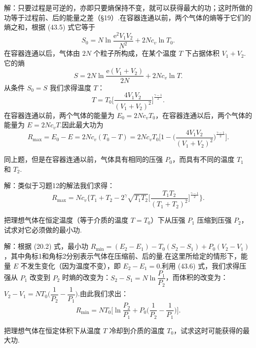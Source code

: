 \begin{xiti}
解：只要过程是可逆的，亦即只要熵保持不变，就可以获得最大的功；这时所做的功等于过程前、后的能量之差（§19）.在容器连通以前，两个气体的熵等于它们的熵之和，根据 (43.5) 式它等于
\begin{equation*}
  S_0=N\ln\frac{\mathrm{e}^2V_1V_2}{N^2}+2Nc_v\ln T_0.
\end{equation*}
在容器连通以后，气体由 $2N$ 个粒子所构成，在某个温度 $T$ 下占据体积 $V_1+V_2$.它的熵
\begin{equation*}
  S=2N\ln\frac{\mathrm{e}\left(V_1+V_2\right)}{2N}+2Nc_v\ln T.
\end{equation*}
从条件 $S_0=S$ 我们求得温度 $T$：
\begin{equation*}
  T=T_0\Big[\frac{4V_1V_2}{\left(V_1+V_2\right)^2}\Big]^{\frac{\gamma-1}{2}}.
\end{equation*}
在容器连通以前，两个气体的能量为 $E_0=2Nc_vT_0$，在容器连通以后，两个气体的能量为 $E=2Nc_vT$.因此最大功为
\begin{equation*}
  R_{\mathrm{max}}=E_0-E=2Nc_v(T_0-T)
  =2Nc_vT_0\Bigg[1-\bigg(\frac{4V_1V_2}{(V_1+V_2)^2}\bigg)^{\frac{\gamma-1}{2}}\Bigg].
\end{equation*}

\quad 同上题，但是在容器连通以前，气体具有相同的压强 $P_0$，而具有不同的温度 $T_1$ 和 $T_2$.

解：类似于习题12的解法我们求得：
\begin{equation*}
  R_{\mathrm{max}}=Nc_v\Bigg\{T_1+T_2
  -2^{\gamma}\sqrt{T_1T_2}
  \Bigg[\frac{T_1T_2}{\left(T_1+T_2\right)^2}\Bigg]^{\frac{\gamma-1}{2}}\Bigg\}.
\end{equation*}

\quad 把理想气体在恒定温度（等于介质的温度 $T=T_0$）下从压强 $P_1$ 压缩到压强 $P_2$，试求对它必须做的最小功.

解：根据 (20.2) 式，最小功 $R_{\mathrm{min}}=(E_2-E_1)-T_0(S_2-S_1)+P_0(V_2-V_1)$，其中角标1和角标2分别表示气体在压缩前、后的量.在这里所给定的情形下，能量 $E$ 不发生变化（因为温度不变），即 $E_2-E_1=0$.利用 (43.6) 式，我们求得压强从 $P_1$ 改变到 $P_2$ 时熵的改变为：$S_2-S_1=N\ln\dfrac{P_1}{P_2}$，而体积的改变为：$V_2-V_1=NT_0\Big(\dfrac{1}{P_2}-\dfrac{1}{P_1}\Big)$.由此我们求出：
\begin{equation*}
  R_{\mathrm{min}}=NT_0\Bigg[\ln\frac{P_2}{P_1}
  +P_0\Big(\frac{1}{P_2}-\frac{1}{P_1}\Big)\Bigg].
\end{equation*}

\quad 把理想气体在恒定体积下从温度 $T$ 冷却到介质的温度 $T_0$，试求这时可能获得的最大功.


\end{xiti}
